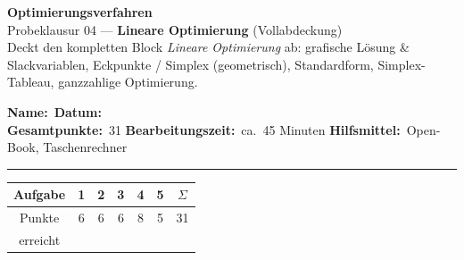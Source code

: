 \documentclass[a4paper,11pt]{article}
\begin{document}
\begin{center}
  {\LARGE\color{accent}\textbf{Optimierungsverfahren}}\\[3pt]
  {\large Probeklausur 04 --- \textbf{Lineare Optimierung} (Vollabdeckung)}\\[2pt]
  {\small Deckt den kompletten Block \emph{Lineare Optimierung} ab: grafische Lösung \& Slackvariablen,
  Eckpunkte / Simplex (geometrisch), Standardform, Simplex-Tableau, ganzzahlige Optimierung.}
\end{center}
\vspace{2mm}
\noindent\textbf{Name:}\ \underline{\hspace{6cm}}\hfill\textbf{Datum:}\ \underline{\hspace{4cm}}\\[4pt]
\noindent\textbf{Gesamtpunkte:}\ 31 \hfill \textbf{Bearbeitungszeit:}\ ca.\ 45 Minuten \hfill \textbf{Hilfsmittel:}\ Open-Book, Taschenrechner\\[3pt]
{\color{gridcol}\rule{\linewidth}{0.4pt}}
\par\vspace{1mm}
\par\vspace{2mm}
\noindent\renewcommand{\arraystretch}{1.2}
\begin{center}
\begin{tabular}{|c|c|c|c|c|c|c|}
\hline
Aufgabe & 1 & 2 & 3 & 4 & 5 & $\Sigma$\\\hline
Punkte & 6 & 6 & 6 & 8 & 5 & 31\\\hline
erreicht & & & & & & \\\hline
\end{tabular}
\end{center}
\end{document}
